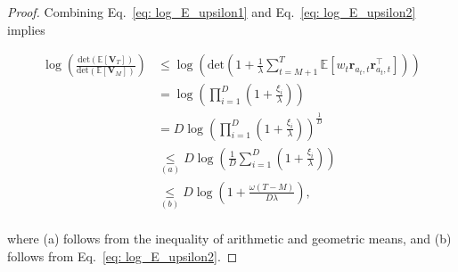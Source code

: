 \begin{proof}
Combining Eq.~\ref{eq: log_E_upsilon1} and Eq.~\ref{eq: log_E_upsilon2} implies 

\[
\begin{aligned}
\log \left( \frac{ \text{det} \left(\mathbb{E}[\boldsymbol{V}_{T}] \right) }{ \text{det} \left(\mathbb{E}[\boldsymbol{V}_{M}] \right)} \right)
& \leq
\log \left( \text{det} \left( 1 +  \frac{1}{\lambda} \sum_{t=M+1}^{T} \mathbb{E}[ w_t \boldsymbol{r}_{a_t,t} \boldsymbol{r}_{a_t,t}^{\top}]  \right) \right) \\
& =
\log \left( \prod_{i=1}^{D} \left( 1 + \frac{\xi_i}{\lambda} \right) \right) \\
& =
D \log \left( \prod_{i=1}^{D} \left( 1 + \frac{\xi_i}{\lambda} \right) \right)^{\frac{1}{D}} \\
& \underset{(a)}{\leq}
D \log \left( \frac{1}{D} \sum_{i=1}^{D} \left( 1 + \frac{\xi_i}{\lambda} \right) \right) \\
& \underset{(b)}{\leq}
D \log \left( 1 +  \frac{\omega (T-M)}{D \lambda} \right), \\
\end{aligned}
\]

where (a) follows from the inequality of arithmetic and geometric means, and (b) follows from Eq.~\ref{eq: log_E_upsilon2}.
\end{proof}



